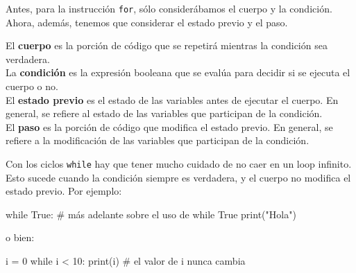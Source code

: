 \documentclass[
  letterpaper,
  DIV=11,
  numbers=noendperiod]{scrreprt}
\newenvironment{Shaded}{\begin{snugshade}}{\end{snugshade}}
\newcommand{\BuiltInTok}[1]{\textcolor[rgb]{0.00,0.23,0.31}{#1}}
\newcommand{\CommentTok}[1]{\textcolor[rgb]{0.37,0.37,0.37}{#1}}
\newcommand{\ControlFlowTok}[1]{\textcolor[rgb]{0.00,0.23,0.31}{#1}}
\newcommand{\DecValTok}[1]{\textcolor[rgb]{0.68,0.00,0.00}{#1}}
\newcommand{\NormalTok}[1]{\textcolor[rgb]{0.00,0.23,0.31}{#1}}
\newcommand{\OperatorTok}[1]{\textcolor[rgb]{0.37,0.37,0.37}{#1}}
\newcommand{\StringTok}[1]{\textcolor[rgb]{0.13,0.47,0.30}{#1}}
\newcommand{\VariableTok}[1]{\textcolor[rgb]{0.07,0.07,0.07}{#1}}
\begin{document}
Antes, para la instrucción \texttt{for}, sólo considerábamos el cuerpo y
la condición. Ahora, además, tenemos que considerar el estado previo y
el paso.

El \textbf{cuerpo} es la porción de código que se repetirá mientras la
condición sea verdadera.\\
La \textbf{condición} es la expresión booleana que se evalúa para
decidir si se ejecuta el cuerpo o no.\\
El \textbf{estado previo} es el estado de las variables antes de
ejecutar el cuerpo. En general, se refiere al estado de las variables
que participan de la condición.\\
El \textbf{paso} es la porción de código que modifica el estado previo.
En general, se refiere a la modificación de las variables que participan
de la condición.\\

\begin{tcolorbox}[enhanced jigsaw, colframe=quarto-callout-warning-color-frame, opacityback=0, opacitybacktitle=0.6, bottomrule=.15mm, toprule=.15mm, coltitle=black, breakable, colback=white, leftrule=.75mm, titlerule=0mm, bottomtitle=1mm, toptitle=1mm, rightrule=.15mm, title=\textcolor{quarto-callout-warning-color}{\faExclamationTriangle}\hspace{0.5em}{Warning}, arc=.35mm, left=2mm, colbacktitle=quarto-callout-warning-color!10!white]

Con los ciclos \texttt{while} hay que tener mucho cuidado de no caer en
un loop infinito. Esto sucede cuando la condición siempre es verdadera,
y el cuerpo no modifica el estado previo. Por ejemplo:

\begin{Shaded}
\begin{Highlighting}[]
\ControlFlowTok{while} \VariableTok{True}\NormalTok{: }\CommentTok{\# más adelante sobre el uso de \textasciigrave{}while True\textasciigrave{}}
    \BuiltInTok{print}\NormalTok{(}\StringTok{"Hola"}\NormalTok{)}
\end{Highlighting}
\end{Shaded}

o bien:

\begin{Shaded}
\begin{Highlighting}[]
\NormalTok{i }\OperatorTok{=} \DecValTok{0}
\ControlFlowTok{while}\NormalTok{ i }\OperatorTok{\textless{}} \DecValTok{10}\NormalTok{:}
    \BuiltInTok{print}\NormalTok{(i) }\CommentTok{\# el valor de i nunca cambia}
\end{Highlighting}
\end{Shaded}

\end{tcolorbox}
\end{document}
